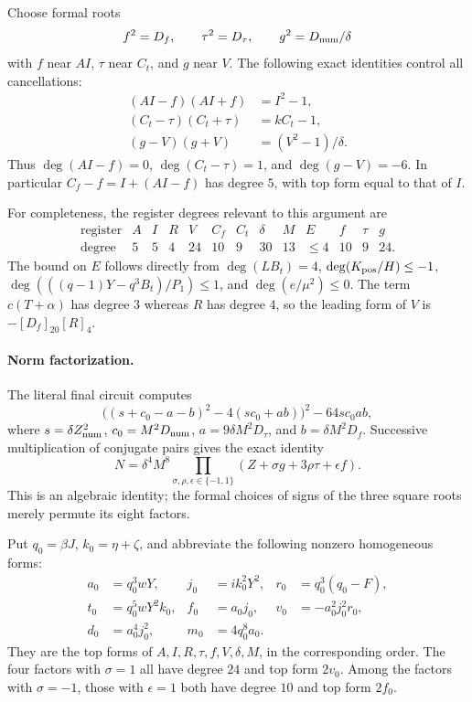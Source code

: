 Choose formal roots
\[
 f^2=D_f,\qquad \tau^2=D_\tau,\qquad
 g^2=D_{\rm num}/\delta
\]
with $f$ near $AI$, $\tau$ near $C_t$, and $g$ near $V$.
The following exact identities control all cancellations:
\begin{align*}
 (AI-f)(AI+f)&=I^2-1,\\
 (C_t-\tau)(C_t+\tau)&=kC_t-1,\\
 (g-V)(g+V)&=(V^2-1)/\delta.
\end{align*}
Thus $\deg(AI-f)=0$, $\deg(C_t-\tau)=1$, and
$\deg(g-V)=-6$.  In particular
$C_f-f=I+(AI-f)$ has degree $5$, with top form equal to that of $I$.

For completeness, the register degrees relevant to this argument are
\[
\begin{array}{c|rrrrrrrrrrrr}
\text{register}&A&I&R&V&C_f&C_t&\delta&M&E&f&\tau&g\\\hline
\text{degree}&5&5&4&24&10&9&30&13&\leq4&10&9&24.
\end{array}
\]
The bound on $E$ follows directly from $\deg(LB_t)=4$,
$\deg(K_{\rm pos}/H)\leq-1$,
$\deg(((q-1)Y-q^3B_t)/P_1)\leq1$, and
$\deg(e/\mu^2)\leq0$.  The term $c(T+\alpha)$ has degree $3$ whereas
$R$ has degree $4$, so the leading form of $V$ is $-[D_f]_{20}[R]_4$.

\paragraph{Norm factorization.}
The literal final circuit computes
\[
 \bigl((s+c_0-a-b)^2-4(sc_0+ab)\bigr)^2-64sc_0ab,
\]
where
$s=\delta Z_{\rm num}^2$, $c_0=M^2D_{\rm num}$,
$a=9\delta M^2D_\tau$, and $b=\delta M^2D_f$.
Successive multiplication of conjugate pairs gives the exact identity
\[
 N=\delta^4M^8
       \prod_{\sigma,\rho,\epsilon\in\{-1,1\}}
           (Z+\sigma g+3\rho\tau+\epsilon f).
\]
This is an algebraic identity; the formal choices of signs of the three
square roots merely permute its eight factors.

Put $q_0=\beta J$, $k_0=\eta+\zeta$, and abbreviate the following
nonzero homogeneous forms:
\begin{align*}
 a_0&=q_0^3wY,&j_0&=ik_0^2Y^2,&
 r_0&=q_0^3(q_0-F),\\
 t_0&=q_0^5wY^2k_0,&f_0&=a_0j_0,&
 v_0&=-a_0^2j_0^2r_0,\\
 d_0&=a_0^4j_0^2,&m_0&=4q_0^8a_0.
\end{align*}
They are the top forms of $A,I,R,\tau,f,V,\delta,M$, in the
corresponding order.  The four factors with $\sigma=1$ all have degree
$24$ and top form $2v_0$.  Among the factors with $\sigma=-1$, those
with $\epsilon=1$ both have degree $10$ and top form $2f_0$.

